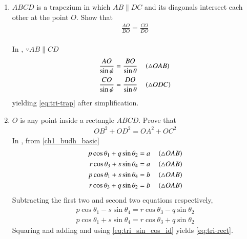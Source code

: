 \begin{enumerate}[label=\thesubsection.\arabic*.,ref=\thesubsection.\theenumi]
\begin{figure}[H]
	\caption{}
	\label{fig:tri-hyp}	
\end{figure}
\item $ABCD$ is a trapezium in which $AB  \parallel  DC$ and its diagonals intersect each other at the point $O$. Show
that
\begin{align}
	\label{eq:tri-trap}	
\frac{AO}{ BO}=\frac{CO}{  DO}
\end{align}
\\
\solution 
	In , $\because AB \parallel CD$	
\begin{align}
	\frac{AO}{\sin \phi} &= \frac{BO}{\sin \theta} \quad \left(\triangle OAB\right)
	\\
	\frac{CO}{\sin \phi} &= \frac{DO}{\sin \theta} \quad \left(\triangle ODC\right)
\end{align}
yielding
	\eqref{eq:tri-trap}	
	after simplification.
\begin{figure}[H]
	\begin{center}
			\resizebox{0.6\columnwidth}{!}{}
	\end{center}
	\caption{}
	\label{fig:tri-trap}	
\end{figure}
\item $O$ is any point inside a rectangle $ABCD$. Prove that 
\begin{align}
	OB^2+OD^2 = OA^2+OC^2
	\label{eq:tri-rect}	
\end{align}
	\solution
	In 
	,	
from \eqref{ch1_budh_basic}
\begin{align}
	p \cos \theta_1+q \sin \theta_2 = a \quad \left(\triangle OAB\right)
	\\
	r \cos \theta_3+s \sin \theta_4 = a \quad \left(\triangle OAB\right)
	\\
	p \cos \theta_1+s \sin \theta_4 = b \quad \left(\triangle OAB\right)
	\\
	r \cos \theta_3+q \sin \theta_2 = b \quad \left(\triangle OAB\right)
\end{align}
Subtracting the first two and second two equations respectively,
\begin{align}
	p \cos \theta_1 
	-s \sin \theta_4  
= r \cos \theta_3-q \sin \theta_2
\\
	p \cos \theta_1+s \sin \theta_4 = 
	r \cos \theta_3+q \sin \theta_2  
\end{align}
Squaring and adding and using 
\eqref{eq:tri_sin_cos_id}
yields
	\eqref{eq:tri-rect}.	
\begin{figure}[H]
	\begin{center}
			\resizebox{0.6\columnwidth}{!}{}
	\end{center}
	\caption{}
	\label{fig:tri-rect}	
\end{figure}
\end{enumerate}

